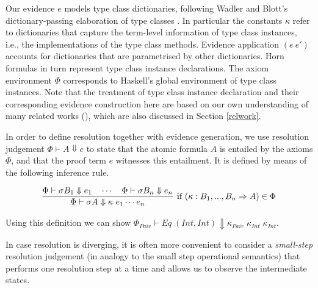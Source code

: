 \documentclass{llncs}
\newcommand{\Conid}[1]{\mathit{#1}}
\newcommand{\Varid}[1]{\mathit{#1}}
\begin{document}
Our evidence $e$ models type class dictionaries, following Wadler and Blott's
dictionary-passing elaboration of type classes \cite{wadler1989make}.  In particular the constants
$\kappa$ refer to dictionaries that capture the term-level information of type
class instances, i.e., the implementations of the type class methods.  Evidence
application $(e\ e')$ accounts for dictionaries that are parametrised by other
dictionaries.  Horn formulas in turn represent type class instance
declarations. The axiom environment $\Phi$ corresponds to Haskell's global
environment of type class instances. Note that the treatment of type class instance declaration
and their corresponding evidence construction here
are based on our own understanding of many related works (\cite{Jones97,jones2003qualified}), which are also discussed in Section \ref{relwork}.  






In order to define resolution  together with evidence generation, we use resolution judgement $\Phi \vdash A \Downarrow e$ to state that the
atomic formula $A$ is entailed by the axioms $\Phi$, and that the proof
term $e$ witnesses this entailment. It is defined by means of the following
 inference rule.
\begin{definition}[Resolution]\label{def:resolution}
\label{context-red}
{\small
\[\begin{array}{c}
  \infer[\text{if}~(\kappa : B_1,..., B_n \Rightarrow A) \in \Phi]
    {\Phi \vdash \sigma A \Downarrow \kappa~e_1 \cdots e_n}
    { \Phi \vdash \sigma B_1 \Downarrow e_1 \quad \cdots \quad \Phi \vdash \sigma B_n \Downarrow e_n 
      } 
  \end{array}
\]}
\end{definition}
Using this definition we can show $\Phi_{\ensuremath{\Conid{Pair}}} \vdash \ensuremath{\Conid{Eq}\;(\Conid{Int},\Conid{Int})} \Downarrow \ensuremath{\kappa_\Varid{Pair}\;\kappa_\Varid{Int}\;\kappa_\Varid{Int}}$.


In case  resolution is diverging, it is often more convenient to consider
a \emph{small-step} resolution judgement (in analogy to the small step
operational semantics) that performs one resolution step at a time and allows
us to observe the intermediate states.
\end{document}
